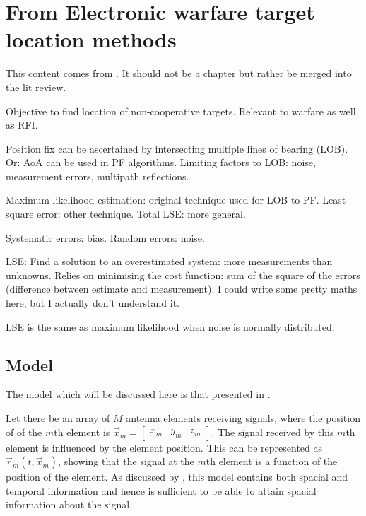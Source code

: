 \chapter{From Electronic warfare target location methods}

This content comes from \cite{poisel2012electronic}. It should not be a chapter but rather be merged into the lit review.

Objective to find location of non-cooperative targets. Relevant to warfare as well as RFI.

Position fix can be ascertained by intersecting multiple lines of bearing (LOB). Or: AoA can be used in PF algorithms. 
Limiting factors to LOB: noise, measurement errors, multipath reflections. 

Maximum likelihood estimation: original technique used for LOB to PF. 
Least-square error: other technique. Total LSE: more general. 

Systematic errors: bias. Random errors: noise. 

LSE: Find a solution to an overestimated system: more measurements than unknowns. Relies on minimising the cost function: sum of the square of the errors (difference between estimate and measurement). I could write some pretty maths here, but I actually don't understand it. 

LSE is the same as maximum likelihood when noise is normally distributed.

\section{Model}

The model which will be discussed here is that presented in \cite{poisel2012electronic}.  

Let there be an array of $M$ antenna elements receiving signals, where the position of of the \(m\)th element is \(\vec{x}_{m} = \begin{bmatrix}x_m & y_m & z_m \end{bmatrix}\).
The signal received by this \(m\)th element is influenced by the element position. 
This can be represented as \(\vec{r}_m(t, \vec{x}_m)\), showing that the signal at the \(m\)th element is a function of the position of the element.
As discussed by \cite{krim1996two}, this model contains both spacial and temporal information and hence is sufficient to be able to attain spacial information about the signal. 

